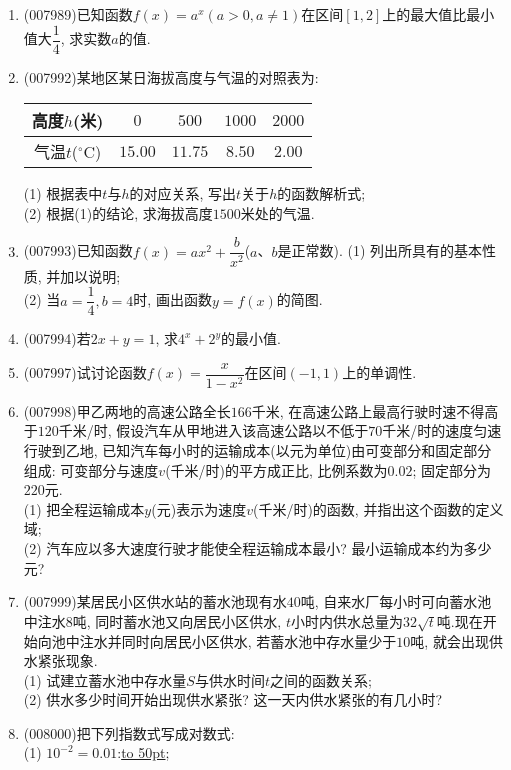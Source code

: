 \documentclass[10pt,a4paper]{article}
\newcommand{\blank}[1]{\underline{\hbox to #1pt{}}}
\begin{document}
\begin{enumerate}[1.]
\item {\tiny (007989)}已知函数$f(x)=a^x(a>0,a\ne 1)$在区间$[1,2]$上的最大值比最小值大$\dfrac 14$, 求实数$a$的值.
\item {\tiny (007992)}某地区某日海拔高度与气温的对照表为:
\begin{center}
    \begin{tabular}{|c|c|c|c|c|}
        \hline
        高度$h$(米)	& $0$ & $500$ & $1000$ & $2000$\\ \hline
        气温$t$($^\circ\text{C}$) &	$15.00$ & $11.75$ & $8.50$ & $2.00$ \\ \hline
    \end{tabular}
\end{center}
(1) 根据表中$t$与$h$的对应关系, 写出$t$关于$h$的函数解析式;\\
(2) 根据(1)的结论, 求海拔高度$1500$米处的气温.
\item {\tiny (007993)}已知函数$f(x)=ax^2+\dfrac b{x^2}$($a$、$b$是正常数).
(1) 列出所具有的基本性质, 并加以说明;\\
(2) 当$a=\dfrac 14,b=4$时, 画出函数$y=f(x)$的简图.
\item {\tiny (007994)}若$2x+y=1$, 求$4^x+2^y$的最小值.
\item {\tiny (007997)}试讨论函数$f(x)=\dfrac x{1-x^2}$在区间$(-1,1)$上的单调性.
\item {\tiny (007998)}甲乙两地的高速公路全长$166$千米, 在高速公路上最高行驶时速不得高于$120$千米/时, 假设汽车从甲地进入该高速公路以不低于$70$千米/时的速度匀速行驶到乙地, 已知汽车每小时的运输成本(以元为单位)由可变部分和固定部分组成: 可变部分与速度$v$(千米/时)的平方成正比, 比例系数为$0.02$; 固定部分为$220$元.\\
(1) 把全程运输成本$y$(元)表示为速度$v$(千米/时)的函数, 并指出这个函数的定义域;\\
(2) 汽车应以多大速度行驶才能使全程运输成本最小? 最小运输成本约为多少元?
\item {\tiny (007999)}某居民小区供水站的蓄水池现有水$40$吨, 自来水厂每小时可向蓄水池中注水$8$吨, 同时蓄水池又向居民小区供水, $t$小时内供水总量为$32\sqrt t$吨.现在开始向池中注水并同时向居民小区供水, 若蓄水池中存水量少于$10$吨, 就会出现供水紧张现象.\\
(1) 试建立蓄水池中存水量$S$与供水时间$t$之间的函数关系;\\
(2) 供水多少时间开始出现供水紧张? 这一天内供水紧张的有几小时?
\item {\tiny (008000)}把下列指数式写成对数式:\\
(1) $10^{-2}=0.01$:\blank{50};\\

\end{enumerate}
\end{document}
